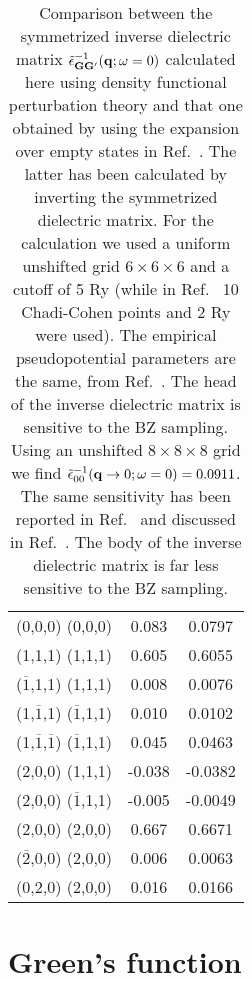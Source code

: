 \documentclass[twocolumn,prb,showpacs,superscriptaddress]{revtex4}
\def\w{\omega}
\def\q{{\bf q}}
\def\G{{\bf G}}
\def\Gp{{\bf G^\prime}}
\def\mo{$\overline{1}$}
\def\mt{$\overline{2}$}
\begin{document}
\begin{table}
\caption{\label{tab.1} Comparison between the symmetrized inverse dielectric matrix
$\tilde\epsilon^{-1}_{\G\Gp}(\q;\w=0)$
calculated here using density functional perturbation theory and that one obtained
by using the expansion over empty states in Ref.\ . The latter has
been calculated by inverting the symmetrized dielectric matrix.
For the calculation we used a uniform unshifted grid $6\times6\times6$ and a cutoff
of 5 Ry (while in Ref.\  10 Chadi-Cohen points and 2 Ry were used). The empirical
pseudopotential parameters are the same, from Ref.\ .
The head of the inverse dielectric matrix is sensitive to the BZ sampling.
Using an unshifted $8\times8\times8$ grid we find $\tilde\epsilon^{-1}_{00}(\q\rightarrow 0;\w=0)=0.0911$.
The same sensitivity has been reported in Ref.\  and discussed
in Ref.\ . The body of the inverse dielectric matrix is far
less sensitive to the BZ sampling.}
\begin{ruledtabular}
\begin{tabular}{c|c|c}
(0,0,0) (0,0,0) & \phantom{-}0.083 &  \phantom{-}0.0797  \\
(1,1,1)  (1,1,1)   &   \phantom{-}0.605    & \phantom{-}0.6055 \\
(\mo,1,1) (1,1,1)   &   \phantom{-}0.008  & \phantom{-}0.0076 \\
 (1,\mo,1) (\mo,1,1)  & \phantom{-}0.010 & \phantom{-}0.0102 \\
 (1,\mo,\mo) (\mo,1,1) & \phantom{-}0.045 & \phantom{-}0.0463 \\
 (2,0,0) (1,1,1)    &    -0.038 & -0.0382 \\
 (2,0,0) (\mo,1,1)   &    -0.005 & -0.0049 \\
 (2,0,0) (2,0,0)    &  \phantom{-}0.667 & \phantom{-}0.6671 \\
 (\mt,0,0) (2,0,0)   & \phantom{-}0.006 & \phantom{-}0.0063 \\
 (0,2,0) (2,0,0)    &  \phantom{-}0.016 & \phantom{-}0.0166 \\
\end{tabular}
\end{ruledtabular}
\end{table}


\section{Green's function}
\end{document}
